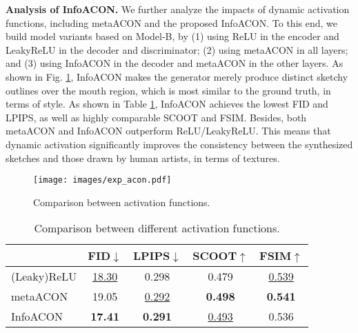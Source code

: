 \documentclass[10pt,twocolumn,letterpaper]{article}
\begin{document}
\textbf{Analysis of InfoACON.}
\label{ssec:exp_ACON}
We further analyze the impacts of dynamic activation functions, including metaACON and the proposed InfoACON. To this end, we build model variants based on Model-B, by (1) using ReLU in the encoder and LeakyReLU in the decoder and discriminator; (2) using metaACON \cite{ma2021acon} in all layers; and (3) using InfoACON in the decoder and metaACON in the other layers.  %
%
As shown in Fig. \ref{fig:exp_ACON}, 
InfoACON makes the generator merely produce distinct sketchy outlines over the mouth region, which is most similar to the ground truth, in terms of style. 
As shown in Table \ref{tab:dinfoACON}, InfoACON achieves the lowest FID and LPIPS, as well as highly comparable SCOOT and FSIM. 
Besides, both metaACON and InfoACON outperform ReLU/LeakyReLU. This means that dynamic activation significantly improves the consistency between the synthesized sketches and those drawn by human artists, in terms of textures. 

\begin{figure}
	\centering
	\texttt{[image: images/exp\_acon.pdf]}
	\caption{Comparison between activation functions.}
	\label{fig:exp_ACON}
\end{figure}

\begin{table}
	\centering
	\caption{Comparison between different activation functions.}
	\label{tab:dinfoACON}
		\begin{tabular}{l|cccc}
			\toprule
			&	FID$\downarrow$	&	LPIPS$\downarrow$	&	SCOOT$\uparrow$	&	FSIM$\uparrow$	\\
			\midrule
			(Leaky)ReLU	&	\underline{18.30}	&	0.298	&	0.479	&	\underline{0.539}	\\
			metaACON	&	19.05	&	\underline{0.292}	&	\textbf{0.498}	&	\textbf{0.541}	\\
			InfoACON	&	\textbf{17.41}	&	\textbf{0.291}	&	\underline{0.493}	&	0.536	\\
			\bottomrule
		\end{tabular}
\end{table}
\end{document}
